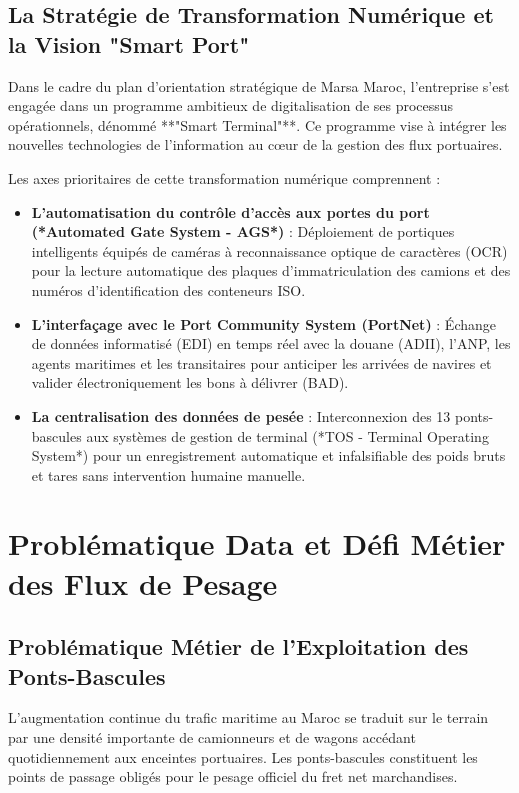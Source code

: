 \documentclass[12pt,a4paper,oneside]{report}
\begin{document}
\subsection{La Stratégie de Transformation Numérique et la Vision "Smart Port"}
Dans le cadre du plan d'orientation stratégique de Marsa Maroc, l'entreprise s'est engagée dans un programme ambitieux de digitalisation de ses processus opérationnels, dénommé **"Smart Terminal"**. Ce programme vise à intégrer les nouvelles technologies de l'information au cœur de la gestion des flux portuaires.

Les axes prioritaires de cette transformation numérique comprennent :
\begin{itemize}
    \item \textbf{L'automatisation du contrôle d'accès aux portes du port (*Automated Gate System - AGS*)} : Déploiement de portiques intelligents équipés de caméras à reconnaissance optique de caractères (OCR) pour la lecture automatique des plaques d'immatriculation des camions et des numéros d'identification des conteneurs ISO.
    \item \textbf{L'interfaçage avec le Port Community System (PortNet)} : Échange de données informatisé (EDI) en temps réel avec la douane (ADII), l'ANP, les agents maritimes et les transitaires pour anticiper les arrivées de navires et valider électroniquement les bons à délivrer (BAD).
    \item \textbf{La centralisation des données de pesée} : Interconnexion des 13 ponts-bascules aux systèmes de gestion de terminal (*TOS - Terminal Operating System*) pour un enregistrement automatique et infalsifiable des poids bruts et tares sans intervention humaine manuelle.
\end{itemize}


\section{Problématique Data et Défi Métier des Flux de Pesage}

\subsection{Problématique Métier de l'Exploitation des Ponts-Bascules}
L'augmentation continue du trafic maritime au Maroc se traduit sur le terrain par une densité importante de camionneurs et de wagons accédant quotidiennement aux enceintes portuaires. Les ponts-bascules constituent les points de passage obligés pour le pesage officiel du fret net marchandises. 
\end{document}
